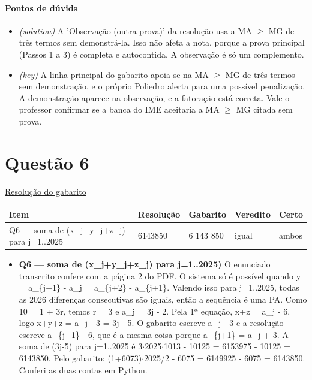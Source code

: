 \documentclass{article}%
\begin{document}
\paragraph{Pontos de dúvida}%
\begin{itemize}%
\item%
\textit{(solution)} A 'Observação (outra prova)' da resolução usa a MA $\geq$ MG de três termos sem demonstrá{-}la. Isso não afeta a nota, porque a prova principal (Passos 1 a 3) é completa e autocontida. A observação é só um complemento.%
\item%
\textit{(key)} A linha principal do gabarito apoia{-}se na MA $\geq$ MG de três termos sem demonstração, e o próprio Poliedro alerta para uma possível penalização. A demonstração aparece na observação, e a fatoração está correta. Vale o professor confirmar se a banca do IME aceitaria a MA $\geq$ MG citada sem prova.%
\end{itemize}%
\section*{Questão 6}%
\href{https://poliedroresolve.sistemapoliedro.com.br/vestibulares/ime/2026/ime-2-fase-dia-1-23-10-2025-2-fase-dia-1/dissertativa-6-matematica-2-fase-dia-1-ime-2026}{Resolução do gabarito}\par\smallskip%
\begin{longtable}{@{}p{} p{} p{} p{} p{}@{}}\toprule Item & Resolução & Gabarito & Veredito & Certo \\ \midrule
Q6 --- soma de (x\_j+y\_j+z\_j) para j=1..2025 & 6143850 & 6 143 850 & igual & ambos \\
\bottomrule\end{longtable}%
\begin{itemize}%
\item%
\textbf{Q6 --- soma de (x\_j+y\_j+z\_j) para j=1..2025)} O enunciado transcrito confere com a página 2 do PDF. O sistema só é possível quando y = a\_\{j+1\} - a\_j = a\_\{j+2\} - a\_\{j+1\}. Valendo isso para j=1..2025, todas as 2026 diferenças consecutivas são iguais, então a sequência é uma PA. Como 10 = 1 + 3r, temos r = 3 e a\_j = 3j - 2. Pela 1ª equação, x+z = a\_j - 6, logo x+y+z = a\_j - 3 = 3j - 5. O gabarito escreve a\_j - 3 e a resolução escreve a\_\{j+1\} - 6, que é a mesma coisa porque a\_\{j+1\} = a\_j + 3. A soma de (3j-5) para j=1..2025 é 3$\cdot$2025$\cdot$1013 - 10125 = 6153975 - 10125 = 6143850. Pelo gabarito: (1+6073)$\cdot$2025/2 - 6075 = 6149925 - 6075 = 6143850. Conferi as duas contas em Python.%
\end{itemize}%
\end{document}
